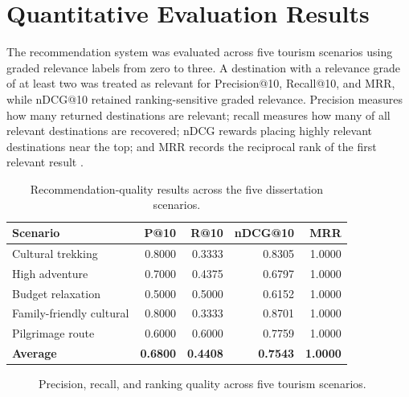 \documentclass[12pt,a4paper,oneside]{report}
\begin{document}
\section{Quantitative Evaluation Results}
\label{sec:quant_eval}

The recommendation system was evaluated across five tourism scenarios using graded relevance labels from zero to three. A destination with a relevance grade of at least two was treated as relevant for Precision@10, Recall@10, and MRR, while nDCG@10 retained ranking-sensitive graded relevance. Precision measures how many returned destinations are relevant; recall measures how many of all relevant destinations are recovered; nDCG rewards placing highly relevant destinations near the top; and MRR records the reciprocal rank of the first relevant result \parencite{Jarvelin2002}.

\begin{table}[h]
\centering
\small
\begin{tabular}{lrrrr}
\toprule
\textbf{Scenario} & \textbf{P@10} & \textbf{R@10} & \textbf{nDCG@10} & \textbf{MRR} \\
\midrule
Cultural trekking & 0.8000 & 0.3333 & 0.8305 & 1.0000 \\
High adventure & 0.7000 & 0.4375 & 0.6797 & 1.0000 \\
Budget relaxation & 0.5000 & 0.5000 & 0.6152 & 1.0000 \\
Family-friendly cultural & 0.8000 & 0.3333 & 0.8701 & 1.0000 \\
Pilgrimage route & 0.6000 & 0.6000 & 0.7759 & 1.0000 \\
\midrule
\textbf{Average} & \textbf{0.6800} & \textbf{0.4408} & \textbf{0.7543} & \textbf{1.0000} \\
\bottomrule
\end{tabular}
\caption{Recommendation-quality results across the five dissertation scenarios.}
\label{tbl:recommendation_metrics}
\end{table}

\begin{figure}[h]
\centering
{}
\caption{Precision, recall, and ranking quality across five tourism scenarios.}
\label{fig:recommendation_metrics}
\end{figure}
\end{document}
